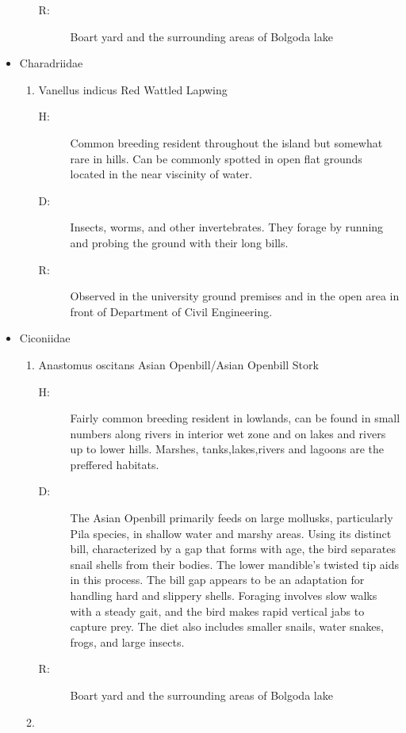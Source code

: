 \begin{itemize}
\begin{enumerate}
\begin{description}
\item[R: ]%
Boart yard and the surrounding areas of Bolgoda lake%
\end{description}%
\end{enumerate}%
\item%
Charadriidae%
\begin{enumerate}%
\item%
Vanellus indicus\newline%
Red Wattled Lapwing%
\begin{description}%
\item[H: ]%
Common breeding resident throughout the island but somewhat rare in hills. Can be commonly spotted in open flat grounds located in the near viscinity of water.%
\item[D: ]%
Insects, worms, and other invertebrates. They forage by running and probing the ground with their long bills.%
\item[R: ]%
Observed in the university ground premises and in the open area in front of Department of Civil Engineering.%
\end{description}%
\end{enumerate}%
\item%
Ciconiidae%
\begin{enumerate}%
\item%
Anastomus oscitans\newline%
Asian Openbill/Asian Openbill Stork%
\begin{description}%
\item[H: ]%
Fairly common breeding resident in lowlands, can be found in small numbers along rivers in interior wet zone and on lakes and rivers up to lower hills. Marshes, tanks,lakes,rivers and lagoons are the preffered habitats.%
\item[D: ]%
The Asian Openbill primarily feeds on large mollusks, particularly Pila species, in shallow water and marshy areas. Using its distinct bill, characterized by a gap that forms with age, the bird separates snail shells from their bodies. The lower mandible's twisted tip aids in this process. The bill gap appears to be an adaptation for handling hard and slippery shells. Foraging involves slow walks with a steady gait, and the bird makes rapid vertical jabs to capture prey. The diet also includes smaller snails, water snakes, frogs, and large insects.%
\item[R: ]%
Boart yard and the surrounding areas of Bolgoda lake%
\end{description}%
\item%

\end{enumerate}
\end{itemize}
